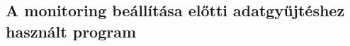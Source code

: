 \appendix
\chapter*{\fuggelek}
\setcounter{chapter}{\appendixnumber}

\section{A monitoring beállítása előtti adatgyűjtéshez használt program}
